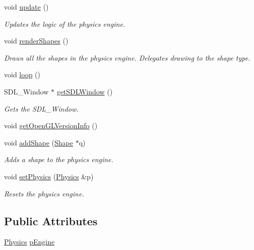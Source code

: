 \begin{DoxyCompactItemize}
void \mbox{\hyperlink{class_s_d_l_graphics_program_a67a6cb42ec9bce6245a617de62cfdc20}{update}} ()
\begin{DoxyCompactList}\small\item\em Updates the logic of the physics engine. \end{DoxyCompactList}\item 
void \mbox{\hyperlink{class_s_d_l_graphics_program_a118c0f825d3d2e8cb3fae0dc4ea1c13e}{render\+Shapes}} ()
\begin{DoxyCompactList}\small\item\em Draws all the shapes in the physics engine. Delegates drawing to the shape type. \end{DoxyCompactList}\item 
void \mbox{\hyperlink{class_s_d_l_graphics_program_afdca0d5835b36a1b18d7eac69056c6ff}{loop}} ()
\item 
S\+D\+L\+\_\+\+Window $\ast$ \mbox{\hyperlink{class_s_d_l_graphics_program_a42e9554ec5b497551530bd5a8ca9585f}{get\+S\+D\+L\+Window}} ()
\begin{DoxyCompactList}\small\item\em Gets the S\+D\+L\+\_\+\+Window. \end{DoxyCompactList}\item 
void \mbox{\hyperlink{class_s_d_l_graphics_program_a7710ed9e68081310be98527fa45fd5dd}{get\+Open\+G\+L\+Version\+Info}} ()
\item 
void \mbox{\hyperlink{class_s_d_l_graphics_program_add4ecb861302c3e883e5630aa86221ce}{add\+Shape}} (\mbox{\hyperlink{class_shape}{Shape}} $\ast$q)
\begin{DoxyCompactList}\small\item\em Adds a shape to the physics engine. \end{DoxyCompactList}\item 
void \mbox{\hyperlink{class_s_d_l_graphics_program_aeb4a2f57b396a2a053a80ff0cc41149d}{set\+Physics}} (\mbox{\hyperlink{class_physics}{Physics}} \&p)
\begin{DoxyCompactList}\small\item\em Resets the physics engine. \end{DoxyCompactList}\end{DoxyCompactItemize}
\subsection*{Public Attributes}
\begin{DoxyCompactItemize}
\item 
\mbox{\hyperlink{class_physics}{Physics}} \mbox{\hyperlink{class_s_d_l_graphics_program_ad79474da1a537585fb5359786b0d8e5d}{p\+Engine}}
\end{DoxyCompactItemize}


